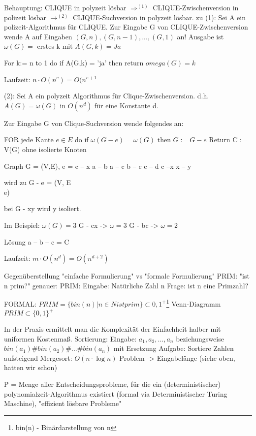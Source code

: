 \documentclass{article} %
\begin{document}
Behauptung: CLIQUE in polyzeit lösbar $\Rightarrow^{(1)}$ CLIQUE-Zwischenversion in polizeit lösbar $\rightarrow^{(2)}$ CLIQUE-Suchversion in polyzeit lösbar.
zu (1): Sei A ein polizeit-Algorithmus für CLIQUE.
Zur Eingabe G von CLIQUE-Zwischenversion wende A auf Eingaben $(G,n), (G,n-1),...,(G,1)$ an!
Ausgabe ist $\omega (G) =$ erstes k mit $A(G,k) = Ja$

\begin{framed}
For k:= n to 1 do
	if A(G,k) = 'ja'
	then return $omega (G) = k $
\end{framed}
Laufzeit: $n \cdot O(n^c) = O(n^{c+1}$


(2): Sei A ein polyzeit Algorithmus für Clique-Zwischenversion.
d.h. $A(G) = \omega (G)$ in $O(n^d)$ für eine Konstante d.

Zur Eingabe G von Clique-Suchversion wende folgendes an:
\begin{framed}
FOR jede Kante $e \in E$ do
	if $\omega (G - e ) = \omega (G)$
	then $G := G - e$
Return C := V(G) ohne isolierte Knoten
\end{framed}

Graph G = (V,E), e = c -- x %
a -- b
a -- c
b -- c
c -- d
c --x %
x -- y

wird zu G - e = (V, E \\ {e}) %

bei G - xy wird y isoliert. %

Im Beispiel: $\omega (G) = 3$
G - cx -> $\omega = 3$
G - bc -> $\omega = 2$ %


Lösung a -- b -- c = C

Laufzeit: $m \cdot O(n^d) = O(n^{d+2})$

Gegenüberstellung "einfache Formulierung" vs "formale Formulierung"
PRIM: "ist n prim?"
genauer: 
PRIM:
Eingabe: Natürliche Zahl n
Frage: ist n eine Primzahl?

FORMAL: $PRIM = \{ bin(n) |  n \in N ist prim\} \subset {0,1}^+$\footnote{bin(n) - Binärdarstellung von n}
Venn-Diagramm $PRIM \subset \{0,1\}^+$

In der Praxis ermittelt man die Komplexität der Einfachheit halber mit uniformen Kostenmaß.
Sortierung:
Eingabe: $a_1, a_2,...,a_n$ beziehungsweise $bin(a_1) \# bin(a_2) \# ... \# bin(a_n) $ mit Ersetzung 
Aufgabe: Sortiere Zahlen aufsteigend
Mergesort: $O(n \cdot \log n)$
Problem -> Eingabelänge (siehe oben, hatten wir schon)


P = Menge aller Entscheidungsprobleme, für die ein (deterministischer) polynomialzeit-Algorithmus existiert (formal via Deterministischer Turing Maschine), "effizient lösbare Probleme"
\end{document}
